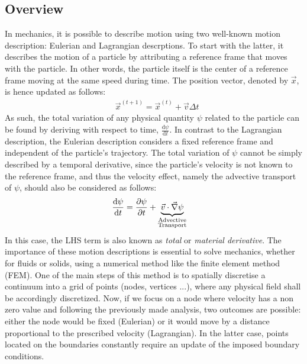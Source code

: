 \subsection{Overview}
In mechanics, it is possible to describe motion using two well-known motion description: Eulerian and Lagrangian descrptions.
To start with the latter, it describes the motion of a particle by attributing a reference frame that moves with the particle.
In other words, the particle itself is the center of a reference frame moving at the same speed during time. 
The position vector, denoted by $\vec{x}$, is hence updated as follows:
\begin{align}
\label{eq:lagrangian}
& \vec{x}^{(t+1)}  = \vec{x}^{(t)} + \vec{v} \Delta t
\end{align}
As such, the total variation of any physical quantity $\psi$ related to the particle 
can be found by deriving with respect to time, $\frac{\mathrm{d} \psi}{\mathrm{d} t}$.
%
In contrast to the Lagrangian description, the Eulerian description considers a 
fixed reference frame and independent of the particle's trajectory. The total variation of $\psi$
cannot be simply described by a temporal derivative, since the particle's velocity is not known to 
the reference frame, and thus the velocity effect, namely the advective transport of $\psi$, should also be considered as follows:
\begin{align}
\label{eq:eulerian}
& \frac{\mathrm{d} \psi}{\mathrm{d} t} = \frac{\partial \psi}{\partial t} 
   + \underbrace{\vec{v} \cdot \vec{\nabla} \psi}_{\substack{\text{Advective} \\ \text{Transport}}}  
\end{align}
In this case, the LHS term is also known as \emph{total} or \emph{material derivative}.
The importance of these motion descriptions is essential to solve mechanics, whether for fluids or solids, using a numerical method like the finite 
element method (FEM). One of the main steps of this method is to spatially discretise a continuum into a grid of points (nodes, vertices ...), where any 
physical field shall be accordingly discretized. Now, if we focus on a node where velocity has a non zero value and following the previously made analysis,
two outcomes are possible: either the node would be fixed (Eulerian) or it would move by a distance proportional to the prescribed velocity (Lagrangian).
In the latter case, points located on the boundaries constantly require an update of the imposed boundary conditions.

